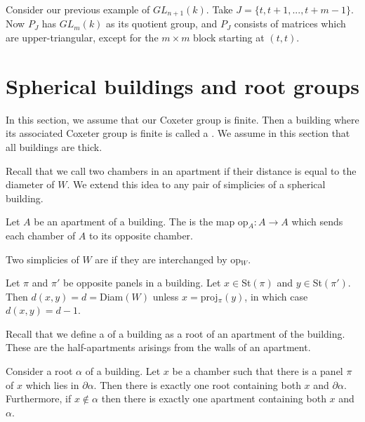 \documentclass[11pt]{article}
\begin{document}
\begin{example}
    Consider our previous example of $GL_{n+1}(k)$. Take $J=\{t,t+1,...,t+m-1\}$. Now $P_J$ has $GL_{m}(k)$ as its quotient group, and $P_J$ consists of matrices which are upper-triangular, except for the $m\times m$ block starting at $(t,t)$. 
\end{example}


\section{Spherical buildings and root groups}

In this section, we assume that our Coxeter group is finite. Then a building where its associated Coxeter group is finite is called a . We assume in this section that all buildings are thick.

Recall that we call two chambers in an apartment  if their distance is equal to the diameter of $W$. We extend this idea to any pair of simplicies of a spherical building. 

\begin{definition}
    Let $A$ be an apartment of a building. The  is the map op$_A: A\to A$ which sends each chamber of $A$ to its opposite chamber. 
\end{definition}

\begin{definition}
    Two simplicies of $W$ are  if they are interchanged by op$_W$. 
\end{definition}


\begin{lemma}
    Let $\pi$ and $\pi '$ be opposite panels in a building. Let $x\in$St$(\pi)$ and $y\in$St$(\pi ')$. Then $d(x,y)=d=$Diam$(W)$ unless $x=$proj$_\pi(y)$, in which case $d(x,y)=d-1$. 
\end{lemma}

Recall that we define a  of a building as a root of an apartment of the building. These are the half-apartments arisings from the walls of an apartment.

\begin{lemma}
    Consider a root $\alpha$ of a building. Let $x$ be a chamber such that there is a panel $\pi$ of $x$ which lies in $\partial\alpha$. Then there is exactly one root containing both $x$ and $\partial\alpha$. Furthermore, if $x\notin \alpha$ then there is exactly one apartment containing both $x$ and $\alpha$. 
\end{lemma}
\end{document}
